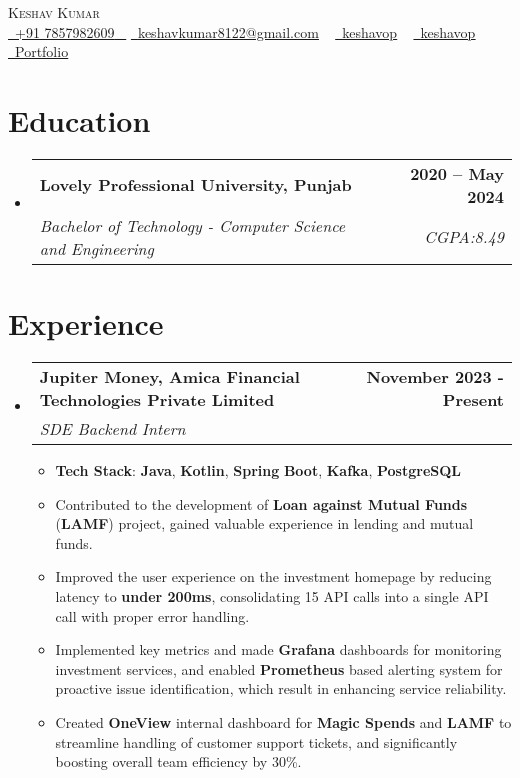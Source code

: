 \documentclass[letterpaper,11pt]{article}
\makeatletter
\newcommand{\resumeItem}[1]{
  \item\small{
    {#1 \vspace{-2pt}}
  }
}
\newcommand{\resumeSubheading}[4]{
  \vspace{-2pt}\item
    \begin{tabular*}{1.0\textwidth}[t]{l@{\extracolsep{\fill}}r}
      \textbf{\large#1} & \textbf{\small #2} \\
      \textit{\large#3} & \textit{\small #4} \\
      
    \end{tabular*}\vspace{-7pt}
}
\newcommand{\resumeSubHeadingListStart}{\begin{itemize}[leftmargin=0.0in, label={}]}
\newcommand{\resumeSubHeadingListEnd}{\end{itemize}}
\newcommand{\resumeItemListStart}{\begin{itemize}}
\newcommand{\resumeItemListEnd}{\end{itemize}\vspace{-5pt}}
\makeatother
\begin{document}


\begin{center}
    {\Huge \scshape Keshav Kumar} \\ \vspace{10pt}
    \small \href{phone:7857982609}{ \raisebox{-0.1\height}\faPhone\ \underline{+91 7857982609} ~} \href{mailto:keshavkumar8122@gmail.com}{\raisebox{-0.2\height}\faEnvelope\  \underline{keshavkumar8122@gmail.com}} ~ 
    \href{https://www.linkedin.com/in/keshavop/}{\raisebox{-0.2\height}\faLinkedinSquare\ \underline{keshavop}}  ~
    \href{https://github.com/Keshavop}{\raisebox{-0.2\height}\faGithub\ \underline{keshavop}} ~
    \href{https://keshavop.in}{\raisebox{-0.2\height}\faUser\ \underline{Portfolio}} ~
    \vspace{-4pt}
\end{center}


\section{Education}
  \resumeSubHeadingListStart
    \resumeSubheading
      {Lovely Professional University, Punjab}{2020 -- May 2024}
      {Bachelor of Technology - Computer Science and Engineering  \textbf{} \textbf{}}{CGPA:8.49}
  \resumeSubHeadingListEnd

\vspace{-3pt}

\section{Experience}
  \resumeSubHeadingListStart
    \resumeSubheading
      {Jupiter Money, Amica Financial Technologies Private Limited}{November 2023 - Present}
      {SDE Backend Intern}{}
      \resumeItemListStart
        \item{
        \textbf{Tech Stack}: \textbf{Java}, \textbf{Kotlin}, \textbf{Spring} \textbf{Boot}, \textbf{Kafka}, \textbf{PostgreSQL} \\
        }
        \resumeItem{Contributed to the development of \textbf{Loan against Mutual Funds} (\textbf{LAMF}) project, gained valuable experience in lending and mutual funds.}
         \resumeItem{Improved the user experience on the investment homepage by reducing latency to \textbf{under 200ms}, consolidating 15 API calls into a single API call with proper error handling.}
        \resumeItem{Implemented key metrics and made \textbf{Grafana} dashboards for monitoring investment services, and enabled \textbf{Prometheus} based alerting system for proactive issue identification, which result in enhancing service reliability.}
        \resumeItem{Created \textbf{OneView} internal dashboard for \textbf{Magic Spends} and \textbf{LAMF} to streamline handling of customer support tickets,  and significantly boosting overall team efficiency by 30\%.}
      \resumeItemListEnd 
  \resumeSubHeadingListEnd
\end{document}
